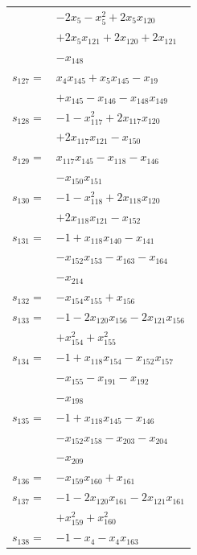 \begin{longtable}{@{}r@{\;}l@{}}
 & \(\displaystyle -2x_{5} -x_{5}^{2} +2x_{5}x_{120}\) \\
 & \(\displaystyle +2x_{5}x_{121} +2x_{120} +2x_{121}\) \\
 & \(\displaystyle -x_{148}\) \\[3pt]
\(s_{127}=\) & \(\displaystyle x_{4}x_{145} +x_{5}x_{145} -x_{19}\) \\
 & \(\displaystyle +x_{145} -x_{146} -x_{148}x_{149}\) \\[3pt]
\(s_{128}=\) & \(\displaystyle -1 -x_{117}^{2} +2x_{117}x_{120}\) \\
 & \(\displaystyle +2x_{117}x_{121} -x_{150}\) \\[3pt]
\(s_{129}=\) & \(\displaystyle x_{117}x_{145} -x_{118} -x_{146}\) \\
 & \(\displaystyle -x_{150}x_{151}\) \\[3pt]
\(s_{130}=\) & \(\displaystyle -1 -x_{118}^{2} +2x_{118}x_{120}\) \\
 & \(\displaystyle +2x_{118}x_{121} -x_{152}\) \\[3pt]
\(s_{131}=\) & \(\displaystyle -1 +x_{118}x_{140} -x_{141}\) \\
 & \(\displaystyle -x_{152}x_{153} -x_{163} -x_{164}\) \\
 & \(\displaystyle -x_{214}\) \\[3pt]
\(s_{132}=\) & \(\displaystyle -x_{154}x_{155} +x_{156}\) \\[3pt]
\(s_{133}=\) & \(\displaystyle -1 -2x_{120}x_{156} -2x_{121}x_{156}\) \\
 & \(\displaystyle +x_{154}^{2} +x_{155}^{2}\) \\[3pt]
\(s_{134}=\) & \(\displaystyle -1 +x_{118}x_{154} -x_{152}x_{157}\) \\
 & \(\displaystyle -x_{155} -x_{191} -x_{192}\) \\
 & \(\displaystyle -x_{198}\) \\[3pt]
\(s_{135}=\) & \(\displaystyle -1 +x_{118}x_{145} -x_{146}\) \\
 & \(\displaystyle -x_{152}x_{158} -x_{203} -x_{204}\) \\
 & \(\displaystyle -x_{209}\) \\[3pt]
\(s_{136}=\) & \(\displaystyle -x_{159}x_{160} +x_{161}\) \\[3pt]
\(s_{137}=\) & \(\displaystyle -1 -2x_{120}x_{161} -2x_{121}x_{161}\) \\
 & \(\displaystyle +x_{159}^{2} +x_{160}^{2}\) \\[3pt]
\(s_{138}=\) & \(\displaystyle -1 -x_{4} -x_{4}x_{163}\) \\

\end{longtable}
